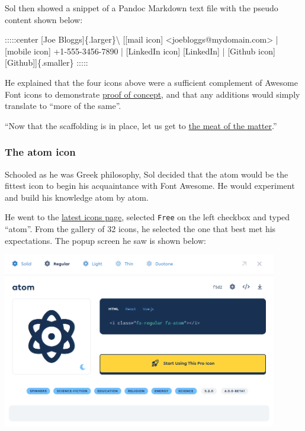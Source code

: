 \documentclass[
  british,
  a4paper,
  rgb,
  dvipsnames,
  svgnames,
  hyphens]{article}
\newenvironment{Shaded}{\begin{snugshade}}{\end{snugshade}}
\newcommand{\CommentTok}[1]{\textcolor[rgb]{0.50,0.62,0.50}{#1}}
\newcommand{\NormalTok}[1]{\textcolor[rgb]{0.80,0.80,0.80}{#1}}
\newcommand{\OtherTok}[1]{\textcolor[rgb]{0.94,0.94,0.56}{#1}}
\begin{document}
Sol then showed a snippet of a Pandoc Markdown text file with the pseudo
content shown below:

\begin{Shaded}
\begin{Highlighting}[]
\NormalTok{:::::center}
\CommentTok{[}\OtherTok{Joe Bloggs}\CommentTok{]}\NormalTok{\{.larger\}\textbackslash{}}
\NormalTok{[}\CommentTok{[}\OtherTok{mail icon}\CommentTok{]} \OtherTok{\textless{}joebloggs@mydomain.com\textgreater{}}\NormalTok{ | }\CommentTok{[}\OtherTok{mobile icon}\CommentTok{]}\NormalTok{ +1{-}555{-}3456{-}7890 |}
\CommentTok{[}\OtherTok{LinkedIn icon}\CommentTok{] [LinkedIn]}\NormalTok{ | }\CommentTok{[}\OtherTok{Github icon}\CommentTok{] [Github]}\NormalTok{]\{.smaller\}}
\NormalTok{:::::}
\end{Highlighting}
\end{Shaded}

He explained that the four icons above were a sufficient complement of
Awesome Font icons to demonstrate
\href{https://en.wikipedia.org/wiki/Proof_of_concept}{proof of concept},
and that any additions would simply translate to ``more of the same''.

``Now that the scaffolding is in place, let us get to
\href{https://idioms.thefreedictionary.com/meat+of+the+matter}{the meat
of the matter}.''

\hypertarget{the-atom-icon}{%
\subsubsection{The atom icon}\label{the-atom-icon}}

Schooled as he was Greek philosophy, Sol decided that the atom would be
the fittest icon to begin his acquaintance with Font Awesome. He would
experiment and build his knowledge atom by atom.

He went to the \href{https://fontawesome.com/v6.0/icons}{latest icons
page}, selected \texttt{Free} on the left checkbox and typed ``atom''.
From the gallery of 32 icons, he selected the one that best met his
expectations. The popup screen he saw is shown below:

\includegraphics[width=0.9\textwidth,height=\textheight]{images/atom.png}
\end{document}
